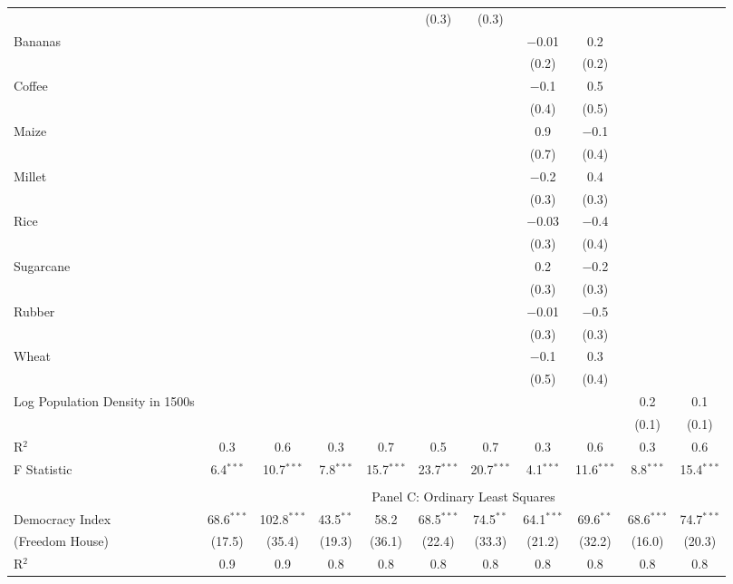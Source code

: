\begin{table}[!htbp]
\begin{threeparttable}
\begin{tabular}{@{\extracolsep{0pt}}lcccccccccc}
  &  &  &  &  & (0.3) & (0.3) &  &  &  &  \\ 
  Bananas &  &  &  &  &  &  & $-$0.01 & 0.2 &  &  \\ 
  &  &  &  &  &  &  & (0.2) & (0.2) &  &  \\ 
  Coffee &  &  &  &  &  &  & $-$0.1 & 0.5 &  &  \\ 
  &  &  &  &  &  &  & (0.4) & (0.5) &  &  \\ 
  Maize &  &  &  &  &  &  & 0.9 & $-$0.1 &  &  \\ 
  &  &  &  &  &  &  & (0.7) & (0.4) &  &  \\ 
  Millet &  &  &  &  &  &  & $-$0.2 & 0.4 &  &  \\ 
  &  &  &  &  &  &  & (0.3) & (0.3) &  &  \\ 
  Rice &  &  &  &  &  &  & $-$0.03 & $-$0.4 &  &  \\ 
  &  &  &  &  &  &  & (0.3) & (0.4) &  &  \\ 
  Sugarcane &  &  &  &  &  &  & 0.2 & $-$0.2 &  &  \\ 
  &  &  &  &  &  &  & (0.3) & (0.3) &  &  \\ 
  Rubber &  &  &  &  &  &  & $-$0.01 & $-$0.5 &  &  \\ 
  &  &  &  &  &  &  & (0.3) & (0.3) &  &  \\ 
  Wheat &  &  &  &  &  &  & $-$0.1 & 0.3 &  &  \\ 
  &  &  &  &  &  &  & (0.5) & (0.4) &  &  \\ 
  Log Population Density in 1500s &  &  &  &  &  &  &  &  & 0.2 & 0.1 \\ 
  &  &  &  &  &  &  &  &  & (0.1) & (0.1) \\ 
R$^{2}$ & 0.3 & 0.6 & 0.3 & 0.7 & 0.5 & 0.7 & 0.3 & 0.6 & 0.3 & 0.6 \\ 
F Statistic & 6.4$^{***}$ & 10.7$^{***}$ & 7.8$^{***}$ & 15.7$^{***}$ & 23.7$^{***}$ & 20.7$^{***}$ & 4.1$^{***}$ & 11.6$^{***}$ & 8.8$^{***}$ & 15.4$^{***}$ \\ 
 \hline \\[-1.8ex] 
  & \multicolumn{10}{c}{Panel C: Ordinary Least Squares} \\
 Democracy Index & 68.6$^{***}$ & 102.8$^{***}$ & 43.5$^{**}$ & 58.2 & 68.5$^{***}$ & 74.5$^{**}$ & 64.1$^{***}$ & 69.6$^{**}$ & 68.6$^{***}$ & 74.7$^{***}$ \\ 
(Freedom House)   & (17.5) & (35.4) & (19.3) & (36.1) & (22.4) & (33.3) & (21.2) & (32.2) & (16.0) & (20.3) \\ 
R$^{2}$ & 0.9 & 0.9 & 0.8 & 0.8 & 0.8 & 0.8 & 0.8 & 0.8 & 0.8 & 0.8 \\ 

\end{tabular}
\end{threeparttable}
\end{table}
